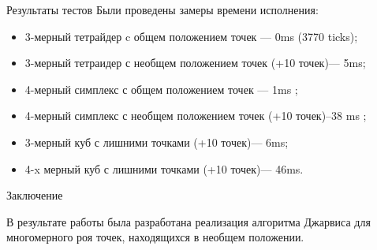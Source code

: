 \documentclass[]{beamer} %
\begin{document}
\begin{frame}{Результаты тестов}
    Были проведены замеры времени исполнения:
    \begin{itemize}
        \item 3-мерный тетрайдер c общем положением точек --- 0ms (3770 ticks);
        \item 3-мерный тетраидер с необщем положением точек (+10 точек)--- 5ms;
        \item 4-мерный симплекс с общем положением точек --- 1ms ;
        \item 4-мерный симплекс с необщем положением точек (+10 точек)--38 ms ;
        \item 3-мерный куб с лишними точками  (+10 точек)--- 6ms;
        \item 4-x мерный куб с лишними точками  (+10 точек)--- 46ms.
    \end{itemize}
\end{frame}

\begin{frame}{Заключение}

    В результате работы была разработана реализация алгоритма Джарвиса  для многомерного роя точек, находящихся в необщем положении.
\end{frame}

\begin{frame}
\end{frame}
\end{document}
